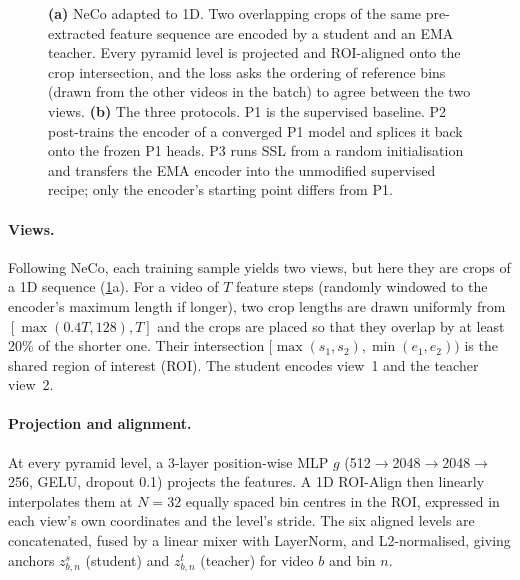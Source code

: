 \documentclass[10pt,a4paper]{article}
\begin{document}
\begin{figure}[t]
\caption{\textbf{(a)} NeCo adapted to 1D. Two overlapping crops of the same pre-extracted
feature sequence are encoded by a student and an EMA teacher. Every pyramid level is
projected and ROI-aligned onto the crop intersection, and the loss asks the ordering of
reference bins (drawn from the other videos in the batch) to agree between the two
views. \textbf{(b)} The three protocols. P1 is the supervised baseline. P2 post-trains
the encoder of a converged P1 model and splices it back onto the frozen P1 heads. P3
runs SSL from a random initialisation and transfers the EMA encoder into the
unmodified supervised recipe; only the encoder's starting point differs from P1.}
\label{fig:method}
\end{figure}

\paragraph{Views.} Following NeCo, each training sample yields two views, but here they
are crops of a 1D sequence (\cref{fig:method}a). For a video of $T$ feature steps
(randomly windowed to the encoder's maximum length if longer), two crop lengths are drawn
uniformly from $[\max(0.4T, 128), T]$ and the crops are placed so that they overlap by at
least 20\% of the shorter one. Their intersection $[\max(s_1,s_2), \min(e_1,e_2))$ is the
shared region of interest (ROI). The student encodes view~1 and the teacher view~2.

\paragraph{Projection and alignment.} At every pyramid level, a 3-layer position-wise MLP
$g$ (512$\to$2048$\to$2048$\to$256, GELU, dropout 0.1) projects the features. A 1D
ROI-Align then linearly interpolates them at $N{=}32$ equally spaced bin centres in
the ROI, expressed in each view's own coordinates and the level's stride. The six aligned
levels are concatenated, fused by a linear mixer with LayerNorm, and L2-normalised, giving
anchors $z^{s}_{b,n}$ (student) and $z^{t}_{b,n}$ (teacher) for video $b$ and bin $n$.
\end{document}
